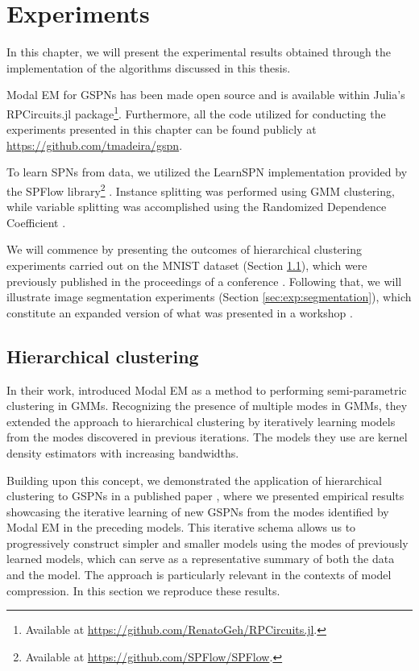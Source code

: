 \chapter{Experiments}
\label{cap:experiments}

In this chapter, we will present the experimental results obtained through the implementation of the algorithms discussed in this thesis.

Modal EM for GSPNs has been made open source and is available within Julia's RPCircuits.jl package\footnote{Available at \url{https://github.com/RenatoGeh/RPCircuits.jl}.}. Furthermore, all the code utilized for conducting the experiments presented in this chapter can be found publicly at \url{https://github.com/tmadeira/gspn}.

To learn SPNs from data, we utilized the LearnSPN implementation provided by the SPFlow library\footnote{Available at \url{https://github.com/SPFlow/SPFlow}.} \citep{Molina2019SPFlow}. Instance splitting was performed using GMM clustering, while variable splitting was accomplished using the Randomized Dependence Coefficient \citep{Lopes-Paz2013}.

We will commence by presenting the outcomes of hierarchical clustering experiments carried out on the MNIST dataset (Section \ref{sec:exp:mnist}), which were previously published in the proceedings of a conference \citep{Madeira2022}. Following that, we will illustrate image segmentation experiments (Section \ref{sec:exp:segmentation}), which constitute an expanded version of what was presented in a workshop \citep{Madeira2023}.

\section{Hierarchical clustering}
\label{sec:exp:mnist}

In their work, \citet{Li2007} introduced Modal EM as a method to performing semi-parametric clustering in GMMs. Recognizing the presence of multiple modes in GMMs, they extended the approach to hierarchical clustering by iteratively learning models from the modes discovered in previous iterations. The models they use are kernel density estimators with increasing bandwidths.

Building upon this concept, we demonstrated the application of hierarchical clustering to GSPNs in a published paper \citep{Madeira2022}, where we presented empirical results showcasing the iterative learning of new GSPNs from the modes identified by Modal EM in the preceding models. This iterative schema allows us to progressively construct simpler and smaller models using the modes of previously learned models, which can serve as a representative summary of both the data and the model. The approach is particularly relevant in the contexts of model compression. In this section we reproduce these results.

